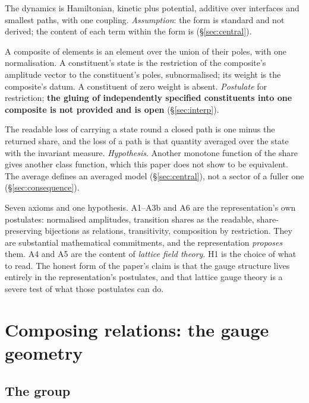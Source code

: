 \documentclass[11pt,a4paper]{article}
\theoremstyle{plain}
\theoremstyle{definition}
\theoremstyle{remark}
\begin{document}
\begin{description}[leftmargin=1.5em,style=nextline]
\item[A5 --- the dynamics.] The dynamics is Hamiltonian, kinetic plus potential, additive over interfaces and smallest paths, with one coupling. \emph{Assumption}: the form is standard and not derived; the content of each term within the form is (\S\ref{sec:central}).
\item[A6 --- composition.] A composite of elements is an element over the union of their poles, with one normalisation. A constituent's state is the restriction of the composite's amplitude vector to the constituent's poles, subnormalised; its weight is the composite's datum. A constituent of zero weight is absent. \emph{Postulate} for restriction; \textbf{the gluing of independently specified constituents into one composite is not provided and is open} (\S\ref{sec:interp}).
\item[H1 --- the loss.] The readable loss of carrying a state round a closed path is one minus the returned share, and the loss of a path is that quantity averaged over the state with the invariant measure. \emph{Hypothesis}. Another monotone function of the share gives another class function, which this paper does not show to be equivalent. The average defines an averaged model (\S\ref{sec:central}), not a sector of a fuller one (\S\ref{sec:consequence}).
\end{description}

Seven axioms and one hypothesis. A1--A3b and A6 are the representation's own postulates: normalised amplitudes, transition shares as the readable, share-preserving bijections as relations, transitivity, composition by restriction. They are substantial mathematical commitments, and the representation \emph{proposes} them. A4 and A5 are the content of \emph{lattice field theory}. H1 is the choice of what to read. The honest form of the paper's claim is that the gauge structure lives entirely in the representation's postulates, and that lattice gauge theory is a severe test of what those postulates can do.

\section{Composing relations: the gauge geometry}\label{sec:geometry}

\subsection{The group}
\end{document}
